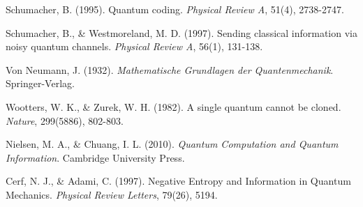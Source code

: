 \documentclass[11pt,a4paper,spanish]{book}
\begin{document}
\begin{thebibliography}{}
Schumacher, B. (1995). Quantum coding. \emph{Physical Review A}, 51(4), 2738-2747.

Schumacher, B., \& Westmoreland, M. D. (1997). Sending classical information via noisy quantum channels. \emph{Physical Review A}, 56(1), 131-138.

Von Neumann, J. (1932). \emph{Mathematische Grundlagen der Quantenmechanik}. Springer-Verlag.

Wootters, W. K., \& Zurek, W. H. (1982). A single quantum cannot be cloned. \emph{Nature}, 299(5886), 802-803.



Nielsen, M. A., \& Chuang, I. L. (2010). \emph{Quantum Computation and Quantum Information}. Cambridge University Press.

Cerf, N. J., \& Adami, C. (1997). Negative Entropy and Information in Quantum Mechanics. \emph{Physical Review Letters}, 79(26), 5194.

\end{thebibliography}
% 
%
\end{document}
